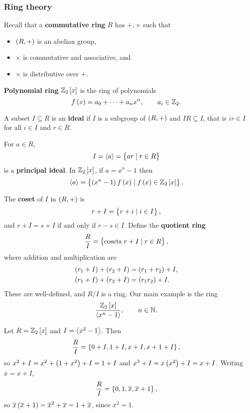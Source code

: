 \subsubsection{Ring theory}

Recall that a \textbf{commutative ring} $ R $ has $ +, \times $ such that
\begin{itemize}
\item $ \br{R, +} $ is an abelian group,
\item $ \times $ is commutative and associative, and
\item $ \times $ is distributive over $ + $.
\end{itemize}

\begin{example*}
\textbf{Polynomial ring} $ \Z_2\sbr{x} $ is the ring of polynomials
$$ f\br{x} = a_0 + \dots + a_nx^n, \qquad a_i \in \Z_2. $$
\end{example*}

A subset $ I \subseteq R $ is an \textbf{ideal} if $ I $ is a subgroup of $ \br{R, +} $ and $ IR \subseteq I $, that is $ ir \in I $ for all $ i \in I $ and $ r \in R $.

\begin{example*}
For $ a \in R $,
$$ I = \abr{a} = \cbr{ar \mid r \in R} $$
is a \textbf{principal ideal}. In $ \Z_2\sbr{x} $, if $ a = x^n - 1 $ then
$$ \abr{a} = \cbr{\br{x^n - 1}f\br{x} \mid f\br{x} \in \Z_2\sbr{x}}. $$
\end{example*}

The \textbf{coset} of $ I $ in $ \br{R, +} $ is
$$ r + I = \cbr{r + i \mid i \in I}, $$
and $ r + I = s + I $ if and only if $ r - s \in I $. Define the \textbf{quotient ring}
$$ \dfrac{R}{I} = \cbr{\text{cosets} \ r + I \mid r \in R}, $$
where addition and multiplication are
\begin{align*}
\br{r_1 + I} + \br{r_2 + I} & = \br{r_1 + r_2} + I, \\
\br{r_1 + I} + \br{r_2 + I} & = \br{r_1r_2} + I.
\end{align*}
These are well-defined, and $ R / I $ is a ring. Our main example is the ring
$$ \dfrac{\Z_2\sbr{x}}{\abr{x^n - 1}}, \qquad n \in \N. $$

\begin{example*}
Let $ R = \Z_2\sbr{x} $ and $ I = \left\langle x^2 - 1 \right\rangle $. Then
$$ \dfrac{R}{I} = \cbr{0 + I, 1 + I, x + I, x + 1 + I}, $$
so $ x^2 + I = x^2 + \br{1 + x^2} + I = 1 + I $ and $ x^3 + I = x\br{x^2} + I = x + I $. Writing $ \overline{x} = x + I $,
$$ \dfrac{R}{I} = \cbr{0, 1, \overline{x}, \overline{x} + 1}, $$
so $ \overline{x}\br{\overline{x} + 1} = \overline{x}^2 + \overline{x} = 1 + \overline{x} $, since $ \overline{x}^2 = 1 $.
\end{example*}

